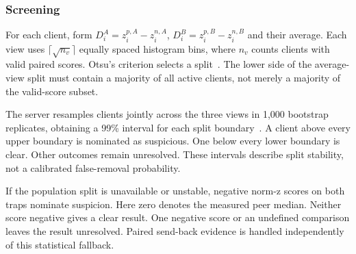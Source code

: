 \documentclass[journal]{IEEEtran}
\begin{document}
\subsubsection{Screening}
For each client, form $D_i^A=z_i^{p,A}-z_i^{n,A}$,
$D_i^B=z_i^{p,B}-z_i^{n,B}$ and their average. Each view uses
$\lceil\sqrt{n_v}\rceil$ equally spaced histogram bins, where $n_v$ counts
clients with valid paired scores. Otsu's criterion selects a
split~\cite{otsu1979threshold}. The lower side of the average-view split
must contain a majority of all active clients, not merely a majority of
the valid-score subset.

The server resamples clients jointly across the three views in 1,000
bootstrap replicates, obtaining a 99\% interval for each split
boundary~\cite{efron1979bootstrap}. A client above every upper boundary
is nominated as suspicious. One below every lower boundary is clear.
Other outcomes remain unresolved. These intervals describe split
stability, not a calibrated false-removal probability.

If the population split is unavailable or unstable, negative norm-z scores
on both traps nominate suspicion. Here zero denotes the measured peer
median. Neither score negative gives a clear result. One negative score
or an undefined comparison leaves the result unresolved. Paired send-back evidence is handled
independently of this statistical fallback.
\end{document}
